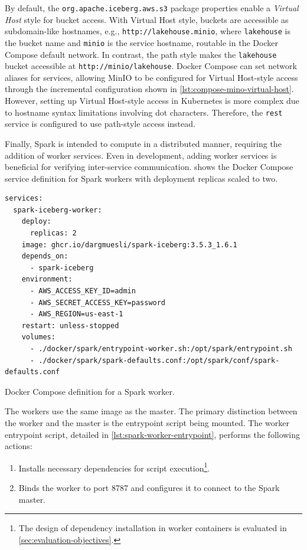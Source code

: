 By default, the \texttt{org.apache.iceberg.aws.s3} package properties enable a \textit{Virtual Host} style for bucket access.
With Virtual Host style, buckets are accessible as subdomain-like hostnames, e.g., \texttt{http://lakehouse.minio}, where \texttt{lakehouse} is the bucket name and \texttt{minio} is the service hostname, routable in the Docker Compose default network.
In contrast, the path style makes the \texttt{lakehouse} bucket accessible at \texttt{http://minio/lakehouse}.
Docker Compose can set network aliases for services, allowing MinIO to be configured for Virtual Host-style access through the incremental configuration shown in \cref{lst:compose-mino-virtual-host}.
However, setting up Virtual Host-style access in Kubernetes is more complex due to hostname syntax limitations involving dot characters.
Therefore, the \texttt{rest} service is configured to use path-style access instead.

Finally, Spark is intended to compute in a distributed manner, requiring the addition of worker services.
Even in development, adding worker services is beneficial for verifying inter-service communication.
 shows the Docker Compose service definition for Spark workers with deployment replicas scaled to two.

\begin{listing}[H]
\begin{verbatim}
services:
  spark-iceberg-worker:
    deploy:
      replicas: 2
    image: ghcr.io/dargmuesli/spark-iceberg:3.5.3_1.6.1
    depends_on:
      - spark-iceberg
    environment:
      - AWS_ACCESS_KEY_ID=admin
      - AWS_SECRET_ACCESS_KEY=password
      - AWS_REGION=us-east-1
    restart: unless-stopped
    volumes:
      - ./docker/spark/entrypoint-worker.sh:/opt/spark/entrypoint.sh
      - ./docker/spark/spark-defaults.conf:/opt/spark/conf/spark-defaults.conf
\end{verbatim}
\caption{Docker Compose definition for a Spark worker.}
\label{lst:compose-spark-worker}
\end{listing}

The workers use the same image as the master.
The primary distinction between the worker and the master is the entrypoint script being mounted.
The worker entrypoint script, detailed in \cref{lst:spark-worker-entrypoint}, performs the following actions:

\begin{enumerate}
    \item Installs necessary dependencies for script execution\footnote{The design of dependency installation in worker containers is evaluated in \cref{sec:evaluation-objectives}.}.
    \item Binds the worker to port 8787 and configures it to connect to the Spark master.
\end{enumerate}

